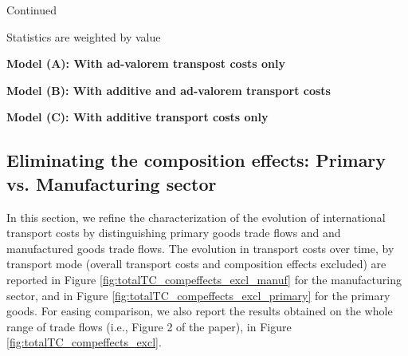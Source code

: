 \documentclass[11pt,twoside, authoryear]{elsarticle}
\begin{document}
\begin{landscape}
\begin{table}[htbp]
\begin{center}
\end{center}
\label{tab_oa:result_ves_ally3}%
\end{table}%

\begin{table}[htbp]

\caption{Continued}
\begin{center}
	
	
			\begin{tablenotes}
		\tiny
		\item Statistics are weighted by value
			\item \textbf{Model (A): With ad-valorem transpost costs only}
			\item \textbf{Model (B): With additive and ad-valorem transport costs}
			\item \textbf{Model (C): With additive transport costs only}
	\end{tablenotes}
	
\end{center}
\label{tab_oa:result_ves_ally3}%
\end{table}%







\end{landscape}





\setcounter{table}{0}
\renewcommand{\thetable}{C.\arabic{table}}

\setcounter{figure}{0}
\renewcommand{\thefigure}{C.\arabic{figure}}

\subsection{Eliminating the composition effects: Primary vs. Manufacturing sector} \label{sec_oa:comp-effects}

In this section, we refine the characterization of the evolution of international transport costs by distinguishing primary goods trade flows and and manufactured goods trade flows. The evolution in transport costs over time, by transport mode (overall transport costs and composition effects excluded) are reported in Figure \ref{fig:totalTC_compeffects_excl_manuf} for the manufacturing sector, and in Figure \ref{fig:totalTC_compeffects_excl_primary} for the primary goods. For easing comparison, we also report the results obtained on the whole range of trade flows (i.e., Figure 2 of the paper), in Figure \ref{fig:totalTC_compeffects_excl}.
\end{document}
